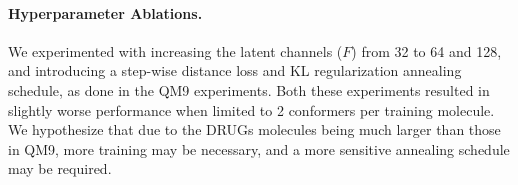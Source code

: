 

\paragraph{Hyperparameter Ablations.} We experimented with increasing the latent channels ($F$) from 32 to 64 and 128, and introducing a step-wise distance loss and KL regularization annealing schedule, as done in the QM9 experiments. Both these experiments resulted in slightly worse performance when limited to 2 conformers per training molecule. We hypothesize that due to the DRUGs molecules being much larger than those in QM9, more training may be necessary, and a more sensitive annealing schedule may be required.


